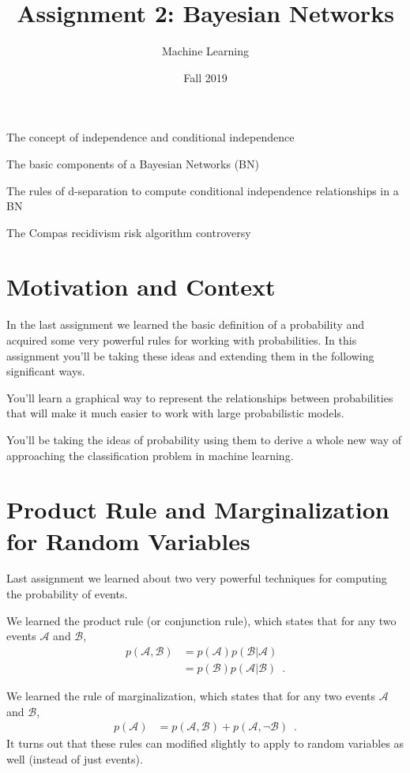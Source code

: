 \documentclass[assignment02_Solutions]{subfiles}
\title{Assignment 2: Bayesian Networks}
\author{Machine Learning}
\date{Fall 2019}
\begin{document}
\maketitle
\thispagestyle{firstpage}


\begin{learningobjectives}
\bi
\item The concept of independence and conditional independence
\item The basic components of a Bayesian Networks (BN)
\item The rules of d-separation to compute conditional independence relationships in a BN
\item The Compas recidivism risk algorithm controversy
\ei
\end{learningobjectives}

\section{Motivation and Context}
In the last assignment we learned the basic definition of a probability and acquired some very powerful rules for working with probabilities.  In this assignment you'll be taking these ideas and extending them in the following significant ways.

\bi
\item You'll learn a graphical way to represent the relationships between probabilities that will make it much easier to work with large probabilistic models.
\item You'll be taking the ideas of probability using them to derive a whole new way of approaching the classification problem in machine learning.
\ei


\section{Product Rule and Marginalization for Random Variables}
\begin{recall}
Last assignment we learned about two very powerful techniques for computing the probability of events.
\bi
\item We learned the product rule (or conjunction rule), which states that for any two events $\mathcal{A}$ and $\mathcal{B}$,
\begin{align}
p(\mathcal{A}, \mathcal{B}) &= p(\mathcal{A}) p(\mathcal{B}|\mathcal{A}) \label{eq:prodcutruleevents} \\
&= p(\mathcal{B}) p(\mathcal{A}|\mathcal{B}) \enspace  . \nonumber
\end{align}
\item We learned the rule of marginalization, which states that for any two events $\mathcal{A}$ and $\mathcal{B}$,
\begin{align}
p(\mathcal{A}) &= p(\mathcal{A}, \mathcal{B}) + p(\mathcal{A}, \neg \mathcal{B}) \label{eq:marginalizationevents} \enspace .
\end{align}
\ei
It turns out that these rules can modified slightly to apply to random variables as well (instead of just events).
\end{recall}
\end{document}
